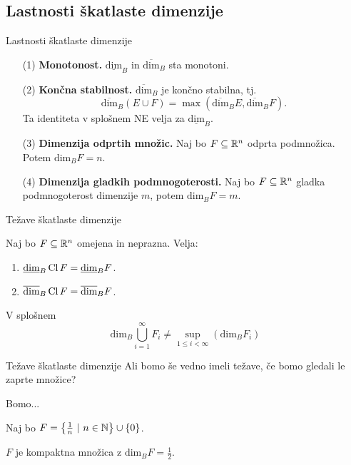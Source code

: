 \documentclass[10pt]{beamer}
\begin{document}
\subsection{Lastnosti škatlaste dimenzije}
\begin{frame}[t]{Lastnosti škatlaste dimenzije}
    \begin{itemize}
        \item[(1)] \textbf{Monotonost.} \(\underline{\text{dim}}_B\) in \(\overline{\text{dim}}_B\) sta monotoni.
        \pause
        \item[(2)] \textbf{Končna stabilnost.} \(\overline{\text{dim}}_B\) je končno stabilna, tj. 
        \[\overline{\text{dim}}_B (E \cup F) = \max (\overline{\text{dim}}_B E, \overline{\text{dim}}_B F).\]
        Ta identiteta v splošnem NE velja za \(\underline{\text{dim}}_B\).
        \pause
        \item[(3)] \textbf{Dimenzija odprtih množic.} Naj bo \(F \subseteq \mathbb{R}^n\) odprta podmnožica. Potem \(\text{dim}_B F = n\).
        \pause
        \item[(4)] \textbf{Dimenzija gladkih podmnogoterosti.} Naj bo \(F \subseteq \mathbb{R}^n\) gladka podmnogoterost dimenzije \(m\), potem \(\text{dim}_B F = m\). 
    \end{itemize}
\end{frame}

\begin{frame}[t]{Težave škatlaste dimenzije}
    \begin{trditev}
        Naj bo \(F \subseteq \mathbb{R}^n\) omejena in neprazna. Velja:
        \begin{enumerate}
            \item \(\underline{\text{dim}}_B \operatorname{Cl} F = \underline{\text{dim}}_B F\).
            \item \(\overline{\text{dim}}_B \operatorname{Cl} F = \overline{\text{dim}}_B F\).
        \end{enumerate}
    \end{trditev}

    \pause
    \begin{posledica}
        V splošnem 
        \[\text{dim}_B \bigcup_{i=1}^\infty F_i \neq \sup_{1 \leq i < \infty} (\text{dim}_B F_i)\]
    \end{posledica}
\end{frame}

\begin{frame}[t]{Težave škatlaste dimenzije}
    Ali bomo še vedno imeli težave, če bomo gledali le zaprte množice?
    \pause

     { Bomo... }
    
    \pause
    \begin{primer}
        Naj bo \(F = \left\{\frac{1}{n} \ | \ n \in \mathbb{N}\right\} \cup \left\{0\right\}\). 
        
        \(F\) je kompaktna množica z \(\text{dim}_B F = \frac{1}{2}\).
    \end{primer}
\end{frame}
\end{document}

